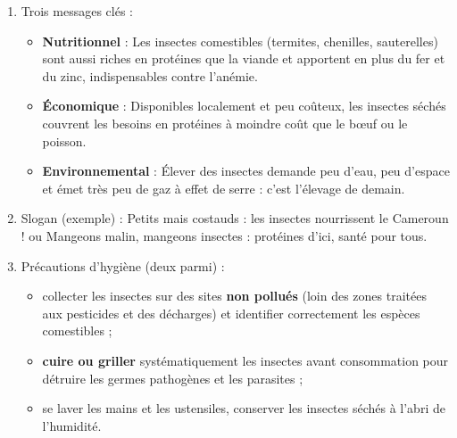 \documentclass[11pt]{article}
\begin{document}
\begin{corrige}
\begin{enumerate}
\item Trois messages clés :
\begin{itemize}
\item \textbf{Nutritionnel} : \og Les insectes comestibles (termites, chenilles, sauterelles) sont aussi riches en protéines que la viande et apportent en plus du fer et du zinc, indispensables contre l'anémie. \fg
\item \textbf{Économique} : \og Disponibles localement et peu coûteux, les insectes séchés couvrent les besoins en protéines à moindre coût que le bœuf ou le poisson. \fg
\item \textbf{Environnemental} : \og Élever des insectes demande peu d'eau, peu d'espace et émet très peu de gaz à effet de serre : c'est l'élevage de demain. \fg
\end{itemize}
\item Slogan (exemple) : \og Petits mais costauds : les insectes nourrissent le Cameroun ! \fg{} ou \og Mangeons malin, mangeons insectes : protéines d'ici, santé pour tous. \fg
\item Précautions d'hygiène (deux parmi) :
\begin{itemize}
\item collecter les insectes sur des sites \textbf{non pollués} (loin des zones traitées aux pesticides et des décharges) et identifier correctement les espèces comestibles ;
\item \textbf{cuire ou griller} systématiquement les insectes avant consommation pour détruire les germes pathogènes et les parasites ;
\item se laver les mains et les ustensiles, conserver les insectes séchés à l'abri de l'humidité.
\end{itemize}
\end{enumerate}
\end{corrige}
\end{document}
